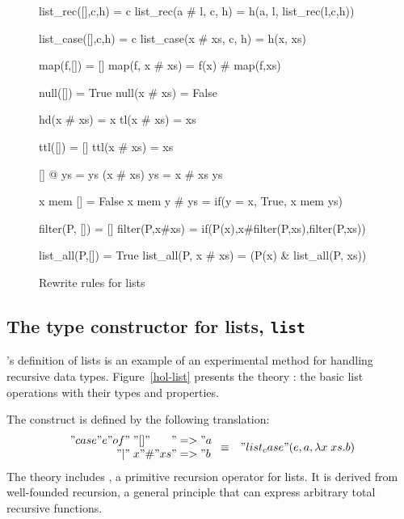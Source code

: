 \begin{figure}
\begin{ttbox}\makeatother
{}      list_rec([],c,h) = c  
     list_rec(a \# l, c, h) = h(a, l, list_rec(l,c,h))

     list_case([],c,h) = c 
    list_case(x # xs, c, h) = h(x, xs)

           map(f,[]) = []
          map(f, x \# xs) = f(x) \# map(f,xs)

          null([]) = True
         null(x # xs) = False

           hd(x # xs) = x
           tl(x # xs) = xs

           ttl([]) = []
          ttl(x # xs) = xs

        [] @ ys = ys
       (x # xs) \at ys = x # xs \at ys

           x mem [] = False
          x mem y # ys = if(y = x, True, x mem ys)

        filter(P, []) = []
       filter(P,x#xs) = if(P(x),x#filter(P,xs),filter(P,xs))

      list_all(P,[]) = True
     list_all(P, x # xs) = (P(x) & list_all(P, xs))
\end{ttbox}
\caption{Rewrite rules for lists} \label{hol-list-simps}
\end{figure}


\subsection{The type constructor for lists, {\tt list}}

\HOL's definition of lists is an example of an experimental method for
handling recursive data types.  Figure~\ref{hol-list} presents the theory
: the basic list operations with their types and properties.

The  construct is defined by the following translation:
{\dquotes
\begin{eqnarray*}
  \begin{array}{r@{\;}l@{}l}
  "case " e " of" & "[]"    & " => " a\\
              "|" & x"\#"xs & " => " b
  \end{array} 
  & \equiv &
  "list_case"(e, a, \lambda x\;xs.b)
\end{eqnarray*}}%
The theory includes , a primitive recursion operator
for lists.  It is derived from well-founded recursion, a general principle
that can express arbitrary total recursive functions.

